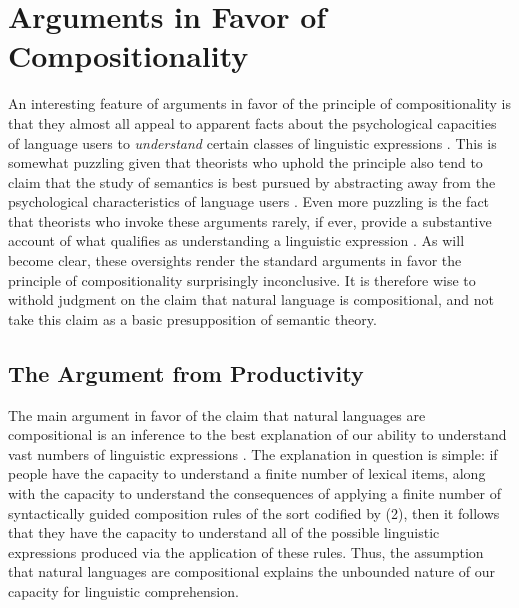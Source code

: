 \section{Arguments in Favor of Compositionality}

An interesting feature of arguments in favor of the principle of compositionality is that they almost all appeal to apparent facts about the psychological capacities of language users to \textit{understand} certain classes of linguistic expressions \citep{Szabo:2013}. This is somewhat puzzling given that theorists who uphold the principle also tend to claim that the study of semantics is best pursued by abstracting away from the psychological characteristics of language users \citep[e.g.,][]{Speaks:2014,Lewis:1970,Lewis:1975,Carpenter:1997}. Even more puzzling is the fact that theorists who invoke these arguments rarely, if ever, provide a substantive account of what qualifies as understanding a linguistic expression \citep{Szabo:2013}. As will become clear, these oversights render the standard arguments in favor the principle of compositionality surprisingly inconclusive. It is therefore wise to withold judgment on the claim that natural language is compositional, and not take this claim as a basic presupposition of semantic theory.

\subsection{The Argument from Productivity}

The main argument in favor of the claim that natural languages are compositional is an inference to the best explanation of our ability to understand vast numbers of linguistic expressions \citep{FodorPylyshyn:1988}. The explanation in question is simple: if people have the capacity to understand a finite number of lexical items, along with the capacity to understand the consequences of applying a finite number of syntactically guided composition rules of the sort codified by (2), then it follows that they have the capacity to understand all of the possible linguistic expressions produced via the application of these rules. Thus, the assumption that natural languages are compositional explains the unbounded nature of our capacity for linguistic comprehension.

